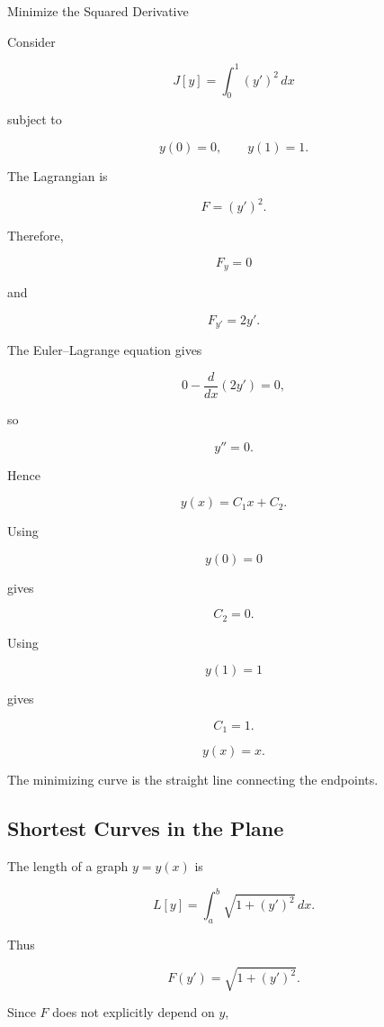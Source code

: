 \begin{workedexamplebox}{Minimize the Squared Derivative}

Consider

\[
J[y]
=
\int_0^1
(y')^2\,dx
\]

subject to

\[
y(0)=0,
\qquad
y(1)=1.
\]

The Lagrangian is

\[
F=(y')^2.
\]

Therefore,

\[
F_y=0
\]

and

\[
F_{y'}=2y'.
\]

The Euler--Lagrange equation gives

\[
0-\frac{d}{dx}(2y')=0,
\]

so

\[
y''=0.
\]

Hence

\[
y(x)=C_1x+C_2.
\]

Using

\[
y(0)=0
\]

gives

\[
C_2=0.
\]

Using

\[
y(1)=1
\]

gives

\[
C_1=1.
\]

\begin{answerbox}
\[
\boxed{
y(x)=x.
}
\]
\end{answerbox}

The minimizing curve is the straight line connecting the endpoints.

\end{workedexamplebox}

\subsection{Shortest Curves in the Plane}
\label{subsec:shortest-plane-curves}

The length of a graph \(y=y(x)\) is

\[
\boxed{
L[y]
=
\int_a^b
\sqrt{1+(y')^2}\,dx.
}
\]

Thus

\[
F(y')
=
\sqrt{1+(y')^2}.
\]

Since \(F\) does not explicitly depend on \(y\),

